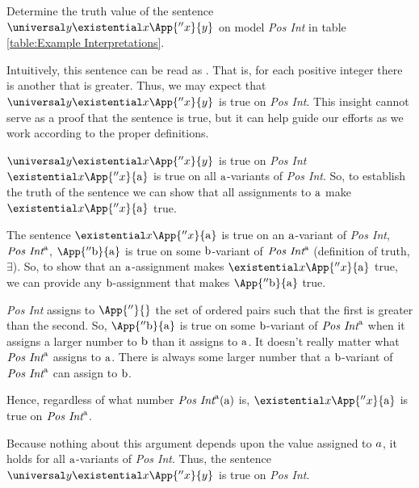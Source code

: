 \begin{majorILnc}{}
Determine the truth value of the sentence $\universal\variable{y}\existential\variable{x}\App{''\variable{x}}{\variable{y}}$ on model \emph{Pos Int} in table \ref{table:Example Interpretations}.
\end{majorILnc}
\begin{PROOF}
	Intuitively, this sentence can be read as .
	That is, for each positive integer there is another that is greater.
	Thus, we may expect that $\universal\variable{y}\existential\variable{x}\App{''\variable{x}}{\variable{y}}$ is true on \emph{Pos Int}.
	This insight cannot serve as a proof that the sentence is true, but it can help guide our efforts as we work according to the proper definitions.

	$\universal\variable{y}\existential\variable{x}\App{''\variable{x}}{\variable{y}}$ is true on \emph{Pos Int} \Iff $\existential\variable{x}\App{''\variable{x}}{\constant{a}}$ is true on all $\mathrm{a}$-variants of \emph{Pos Int}. 
	So, to establish the truth of the sentence we can show that all assignments to $\mathrm{a}$ make $\existential\variable{x}\App{''\variable{x}}{\constant{a}}$ true.

	The sentence $\existential\variable{x}\App{''\variable{x}}{\constant{a}}$ is true on an $\mathrm{a}$-variant of \emph{Pos Int}, $\emph{Pos Int}^{\mathrm{a}}$, \Iff $\App{''\constant{b}}{\constant{a}}$ is true on some $\mathrm{b}$-variant of $\emph{Pos Int}^{\mathrm{a}}$ (definition of truth, $\exists$).
	So, to show that an $\mathrm{a}$-assignment makes $\existential\variable{x}\App{''\variable{x}}{\constant{a}}$ true, we can provide any $\mathrm{b}$-assignment that makes $\App{''\constant{b}}{\constant{a}}$ true.
	
	\emph{Pos Int} assigns to $\App{''}{}$ the set of ordered pairs such that the first is greater than the second. 
	So, $\App{''\constant{b}}{\constant{a}}$ is true on some $\mathrm{b}$-variant of $\emph{Pos Int}^{\mathrm{a}}$ when it assigns a larger number to $\mathrm{b}$ than it assigns to $\mathrm{a}$.
	It doesn't really matter what $\emph{Pos Int}^{\mathrm{a}}$ assigns to $\mathrm{a}$. 
	There is always some larger number that a $\mathrm{b}$-variant of $\emph{Pos Int}^{\mathrm{a}}$ can assign to $\mathrm{b}$. 
	
	Hence, regardless of what number $\emph{Pos Int}^{\mathrm{a}}(\mathrm{a})$ is, $\existential\variable{x}\App{''\variable{x}}{\constant{a}}$ is true on $\emph{Pos Int}^{\mathrm{a}}$.

	Because nothing about this argument depends upon the value assigned to $a$, it holds for all $\mathrm{a}$-variants of \emph{Pos Int}. 
	Thus, the sentence $\universal\variable{y}\existential\variable{x}\App{''\variable{x}}{\variable{y}}$ is true on \emph{Pos Int}.
\end{PROOF}

